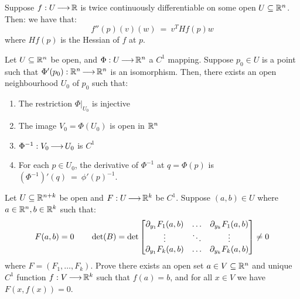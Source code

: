 \begin{thm}[title=Second Derivatives]
    Suppose $ f:U \operatorname{\longrightarrow} \mathbb{R} $ is twice continuously differentiable on some open
    $ U \subseteq \mathbb{R}^{n} $. Then: we have that:
    \begin{equation*}
        f''(p)(v)(w) \ = \ v^{T}Hf(p)w
    \end{equation*}
    where $ Hf(p) $ is the Hessian of $ f $ at $ p $.
\end{thm}
\vspace{-0.2in}
\begin{thm}[title=Inverse Function Theorem]
    Let $ U \subseteq \mathbb{R}^{n} $ be open, and $ \Phi: U \operatorname{\longrightarrow} \mathbb{R}^{n} $ a
    $ C^{1} $ mapping. Suppose $ p_{0} \in U $ is a point such that
    $ \Phi'(p_{0}): \mathbb{R}^{n} \operatorname{\longrightarrow} \mathbb{R}^{n} $ is an isomorphism. Then, there
    exists an open neighbourhood $ U_{0} $ of $ p_{0} $ such that:
    \begin{enumerate}
        \item The restriction $ \Phi\rvert_{U_{0}} $ is injective
        \item The image $ V_{0} = \Phi(U_{0}) $ is open in $ \mathbb{R}^{n} $
        \item $ \Phi^{-1}:V_{0} \operatorname{\longrightarrow} U_{0} $ is $ C^{1} $
        \item For each $ p \in U_{0} $, the derivative of $ \Phi^{-1} $ at
            $ q = \Phi(p) $ is $ (\Phi^{-1})'(q) \ = \ \phi'(p)^{-1} $.
    \end{enumerate}
\end{thm}
\vspace{-0.2in}
\begin{thm}[title=Implicit Function Theorem]
    Let $ U \subseteq \mathbb{R}^{n+k} $ be open and $ F: U \operatorname{\longrightarrow} \mathbb{R}^{k} $ be
    $ C^{1} $. Suppose $ (a, b) \in U $ where $ a \in \mathbb{R}^{n}, b \in \mathbb{R}^{k} $
    such that:
    \begin{equation*}
        F(a, b) = 0 \qquad \det(B) = \det
        \begin{bmatrix}
            \partial_{y_{1}}F_{1}(a,b) & \dots & \partial_{y_{k}}F_{1}(a,b) \\
            \vdots & \ddots & \vdots \\
            \partial_{y_{1}}F_{k}(a,b) & \dots & \partial_{y_{k}}F_{k}(a,b)
        \end{bmatrix}
        \neq 0
    \end{equation*}
    where $ F = (F_{1},\dots,F_{k}) $. \vsp
    Prove there exists an open set $ a \in V \subseteq \mathbb{R}^{n} $ and unique
    $ C^{1} $ function $ f:V \operatorname{\longrightarrow} \mathbb{R}^{k} $ such that $ f(a) = b $, and for
    all $ x \in V $ we have $ F(x,f(x)) = 0 $.
\end{thm}
